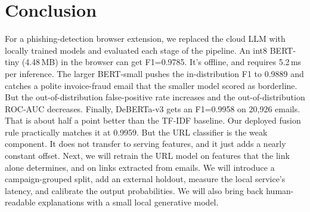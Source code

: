 \documentclass[conference]{IEEEtran}
\begin{document}
\section{Conclusion}
For a phishing-detection browser extension, we replaced the cloud LLM with locally trained models and evaluated each stage of the pipeline. An int8 BERT-tiny (4.48\,MB) in the browser can get F1=0.9785. It's offline, and requires 5.2\,ms per inference. The larger BERT-small pushes the in-distribution F1 to 0.9889 and catches a polite invoice-fraud email that the smaller model scored as borderline. But the out-of-distribution false-positive rate increases and the out-of-distribution ROC-AUC decreases. Finally, DeBERTa-v3 gets an F1=0.9958 on 20,926 emails. That is about half a point better than the TF-IDF baseline. Our deployed fusion rule practically matches it at 0.9959. But the URL classifier is the weak component. It does not transfer to serving features, and it just adds a nearly constant offset. Next, we will retrain the URL model on features that the link alone determines, and on links extracted from emails. We will introduce a campaign-grouped split, add an external holdout, measure the local service's latency, and calibrate the output probabilities. We will also bring back human-readable explanations with a small local generative model.



\end{document}
